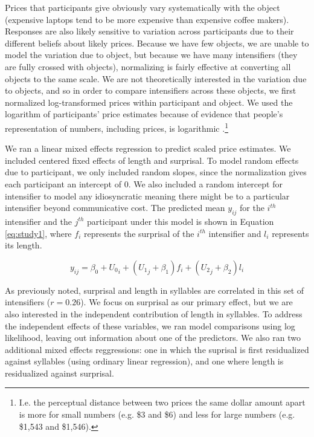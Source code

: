 Prices that participants give obviously vary systematically with the object (expensive laptops tend to be more expensive than expensive coffee makers).
Responses are also likely sensitive to variation across participants due to their different beliefs about likely prices.
Because we have few objects, we are unable to model the variation due to object, but because we have many intensifiers (they are fully crossed with objects), normalizing is fairly effective at converting all objects to the same scale.
We are not theoretically interested in the variation due to objects, and so in order to compare intensifiers across these objects, we first normalized log-transformed prices within participant and object.
We used the logarithm of participants' price estimates because of evidence that people's representation of numbers, including prices, is logarithmic \cite{fechner_elements_1860}.\footnote{
  I.e. the perceptual distance between two prices the same dollar amount apart is more for small numbers (e.g. \$3 and \$6) and less for large numbers (e.g. \$1,543 and \$1,546).
}

We ran a linear mixed effects regression to predict scaled price estimates. We included centered fixed effects of length and surprisal. To model random effects due to participant, we only included random slopes, since the normalization gives each participant an intercept of 0.  We also included a random intercept for intensifier to model any idiosyncratic meaning there might be to a particular intensifier beyond communicative cost. 
The predicted mean $y_{ij}$ for the $i^{th}$ intensifier and the $j^{th}$ participant under this model is shown in Equation \ref{eq:study1}, where $f_i$ represents the surprisal of the $i^{th}$ intensifier and $l_i$ represents its length. %


\begin{equation}
\label{eq:study1}
y_{ij} = \beta_0 + {U_0}_{i} + ({U_1}_{j} + \beta_1) {f}_{i} + ({U_2}_{j} + \beta_2) {l}_{i}
\end{equation}

As previously noted, surprisal and length in syllables are correlated in this set of intensifiers ($r=0.26$).
We focus on surprisal as our primary effect, but we are also interested in the independent contribution of length in syllables.
To address the independent effects of these variables, we ran model comparisons using log likelihood, leaving out information about one of the predictors.
We also ran two additional mixed effects reggressions: one in which the suprisal is first residualized against syllables (using ordinary linear regression), and one where length is residualized against surprisal.


